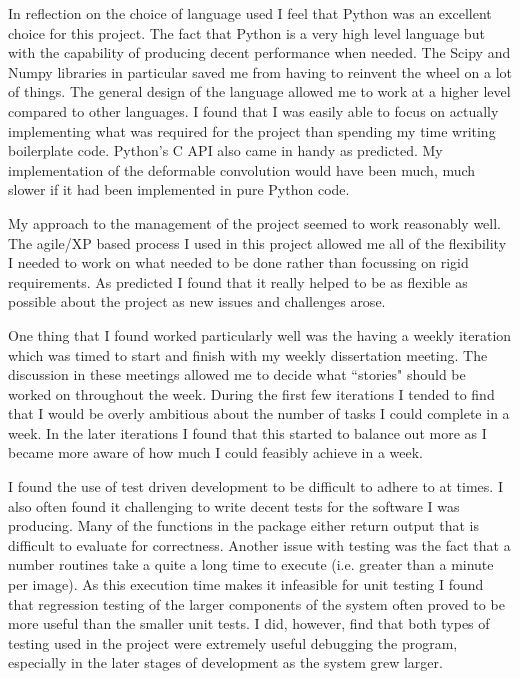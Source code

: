 In reflection on the choice of language used I feel that Python was an excellent choice for this project. The fact that Python is a very high level language but with the capability of producing decent performance when needed. The Scipy and Numpy libraries in particular saved me from having to reinvent the wheel on a lot of things. The general design of the language allowed me to work at a higher level compared to other languages. I found that I was easily able to focus on actually implementing what was required for the project than spending my time writing boilerplate code. Python's C API also came in handy as predicted. My implementation of the deformable convolution would have been much, much slower if it had been implemented in pure Python code.

My approach to the management of the project seemed to work reasonably well. The agile/XP based process I used in this project allowed me all of the flexibility I needed to work on what needed to be done rather than focussing on rigid requirements. As predicted I found that it really helped to be as flexible as possible about the project as new issues and challenges arose.

One thing that I found worked particularly well was the having a weekly iteration which was timed to start and finish with my weekly dissertation meeting. The discussion in these meetings allowed me to decide what ``stories" should be worked on throughout the week. During the first few iterations I tended to find that I would be overly ambitious about the number of tasks I could complete in a week. In the later iterations I found that this started to balance out more as I became more aware of how much I could feasibly achieve in a week.

I found the use of test driven development to be difficult to adhere to at times. I also often found it challenging to write decent tests for the software I was producing. Many of the functions in the package either return output that is difficult to evaluate for correctness. Another issue with testing was the fact that a number routines take a quite a long time to execute (i.e. greater than a minute per image). As this execution time makes it infeasible for unit testing I found that regression testing of the larger components of the system often proved to be more useful than the smaller unit tests. I did, however, find that both types of testing used in the project were extremely useful debugging the program, especially in the later stages of development as the system grew larger. 

